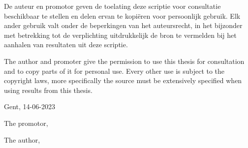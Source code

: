 

\par\vspace*{\fill}

De auteur en promotor geven de toelating deze scriptie voor consultatie beschikbaar te stellen en delen ervan te kopi\"eren voor persoonlijk gebruik. Elk ander gebruik valt onder de beperkingen van het auteursrecht, in het bijzonder met betrekking tot de verplichting uitdrukkelijk de bron te vermelden bij het aanhalen van resultaten uit deze scriptie.

The author and promoter give the permission to use this thesis for consultation and to copy parts of it for personal use. Every other use is subject to the copyright laws, more specifically the source must be extensively specified when using results from this thesis.

\vspace{1cm}

Gent, 14-06-2023 %

\vspace{1cm}

\begin{minipage}[t][4cm][t]{0.5\textwidth}
\raggedright
The promotor,

\vspace{2.5cm}

\insertpromotor %
\end{minipage}
\begin{minipage}[t][4cm][t]{0.48\textwidth}
\raggedright
The author,

\vspace{2.5cm}

\insertauthor %
\end{minipage}

\thispagestyle{empty} 

